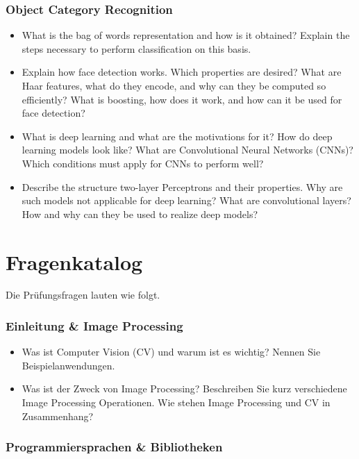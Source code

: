 \documentclass[paper=A4,11pt]{scrartcl}
\begin{document}
\subsubsection*{Object Category Recognition} %

\begin{itemize}
    \item What is the bag of words representation and how is it obtained? Explain the steps necessary to perform classification on this basis.
    \item Explain how face detection works. Which properties are desired? What are Haar features, what do they encode, and why can they be computed so efficiently? What is boosting, how does it work, and how can it be used for face detection?
    \item What is deep learning and what are the motivations for it? How do deep learning models look like? What are Convolutional Neural Networks (CNNs)? Which conditions must apply for CNNs to perform well?
    \item Describe the structure two-layer Perceptrons and their properties. Why are such models not applicable for deep learning? What are convolutional layers? How and why can they be used to realize deep models?
\end{itemize}

\pagebreak

\section{Fragenkatalog} %
\label{sec:fragenkatalog}

Die Prüfungsfragen lauten wie folgt.

\subsubsection*{Einleitung \& Image Processing} %

\begin{itemize}
    \item Was ist Computer Vision (CV) und warum ist es wichtig? Nennen Sie Beispielanwendungen.
    \item Was ist der Zweck von Image Processing? Beschreiben Sie kurz verschiedene Image Processing Operationen. Wie stehen Image Processing und CV in Zusammenhang?
\end{itemize}

\subsubsection*{Programmiersprachen \& Bibliotheken} %
\end{document}
